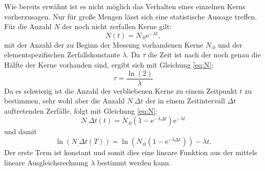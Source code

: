 Wie bereits erwähnt ist es nicht möglich das Verhalten eines einzelnen Kerns vorherzusagen. Nur für große Mengen lässt sich eine statistische Aussage treffen.
Für die Anzahl $N$ der noch nicht zerfallen Kerne gilt:
\begin{equation}
N(t)=N_.0\mathrm{e}^{-\lambda t},\label{eq:N}
\end{equation}
mit der Anzahl der zu Beginn der Messung vorhandenen Kerne $N_.0$ und der elementspezifischen Zerfallskonstante $\lambda$.
Da $\tau$ die Zeit ist nach der noch genau die Hälfte der Kerne vorhanden sind, ergibt sich mit Gleichung \eqref{eq:N}:
\begin{equation}
\tau=\frac{\ln{(2)}}{\lambda}\label{eq:T}
\end{equation}
Da es schwierig ist die Anzahl der verbliebenen Kerne zu einem Zeitpunkt $t$ zu bestimmen, sehr wohl aber die Anzahl $N_.{\Delta t}$ der in einem Zeitintervall $\Delta t$ auftretenden Zerfälle, folgt mit Gleichung \eqref{eq:N}:
\begin{equation*}
N_.{\Delta t}(t)=N_.0\left(1-\mathrm{e}^{-\lambda\Delta t}\right)\mathrm{e}^{-\lambda t}
\end{equation*}
und damit 
\begin{equation}
\ln{\left(N_.{\Delta t}(T)\right)} = \ln{\left(N_.0\left(1-\mathrm{e^{-\lambda\Delta t}}\right)\right)}-\lambda t\text{.}\label{eq:ln}
\end{equation}
Der erste Term ist konstant und somit dies eine lineare Funktion aus der mittels lineare Ausgleichsrechnung $\lambda$ bestimmt werden kann.
